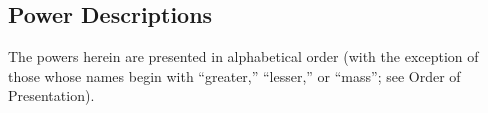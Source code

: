 % 
% 
% 



\clearpage
\begin{strip}
\section{Power Descriptions}
The powers herein are presented in alphabetical order (with the exception of those whose names begin with ``greater,'' ``lesser,'' or ``mass''; see Order of Presentation).
\end{strip}


